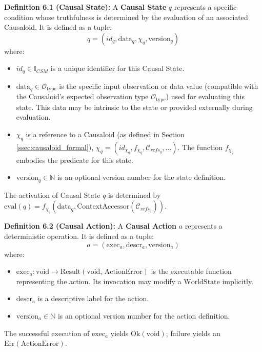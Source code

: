 \noindent\textbf{Definition 6.1 (Causal State):} A \textbf{Causal State} \(q\) represents a specific condition whose truthfulness is determined by the evaluation of an associated Causaloid. It is defined as a tuple:
\[ q = (id_q, \text{data}_q, \chi_q, \text{version}_q) \]
where:
\begin{itemize}
    \item \( id_q \in \mathbb{I}_{CSM} \) is a unique identifier for this Causal State.
    \item \( \text{data}_q \in \mathcal{O}_{\text{type}} \) is the specific input observation or data value (compatible with the Causaloid's expected observation type \(\mathcal{O}_{\text{type}}\)) used for evaluating this state. This data may be intrinsic to the state or provided externally during evaluation.
    \item \( \chi_q \) is a reference to a Causaloid (as defined in Section \ref{ssec:causaloid_formal}), \( \chi_q = (id_{\chi_q}, f_{\chi_q}, \mathcal{C}_{refs_q}, \dots) \). The function \(f_{\chi_q}\) embodies the predicate for this state.
    \item \( \text{version}_q \in \mathbb{N} \) is an optional version number for the state definition.
\end{itemize}
The activation of Causal State \(q\) is determined by \( \text{eval}(q) = f_{\chi_q}(\text{data}_q, \text{ContextAccessor}(\mathcal{C}_{refs_q})) \).

\noindent\textbf{Definition 6.2 (Causal Action):} A \textbf{Causal Action} \(a\) represents a deterministic operation. It is defined as a tuple:
\[ a = (\text{exec}_a, \text{descr}_a, \text{version}_a) \]
where:
\begin{itemize}
    \item \( \text{exec}_a: \text{void} \to \text{Result}(\text{void, ActionError}) \) is the executable function representing the action. Its invocation may modify a \(\text{WorldState}\) implicitly.
    \item \( \text{descr}_a \) is a descriptive label for the action.
    \item \( \text{version}_a \in \mathbb{N} \) is an optional version number for the action definition.
\end{itemize}
The successful execution of \( \text{exec}_a \) yields \( \text{Ok}(\text{void}) \); failure yields an \( \text{Err}(\text{ActionError}) \).

\vspace{\baselineskip} %

